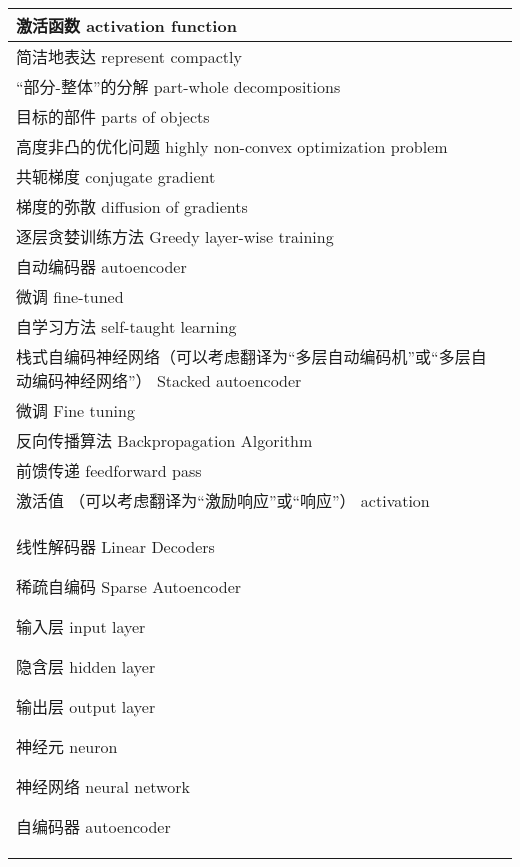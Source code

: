 \begin{longtable}[h]{m{}m{}}
激活函数 activation function \\
  \midrule

简洁地表达 represent compactly \\
  \midrule

“部分-整体”的分解 part-whole decompositions \\
  \midrule

目标的部件 parts of objects \\
  \midrule

高度非凸的优化问题 highly non-convex optimization problem \\
  \midrule

共轭梯度 conjugate gradient \\
  \midrule

梯度的弥散 diffusion of gradients \\
  \midrule

逐层贪婪训练方法 Greedy layer-wise training \\
  \midrule

自动编码器 autoencoder \\
  \midrule

微调 fine-tuned \\
  \midrule

自学习方法 self-taught learning \\
  \midrule

栈式自编码神经网络（可以考虑翻译为“多层自动编码机”或“多层自动编码神经网络”） Stacked autoencoder \\
  \midrule

微调 Fine tuning \\
  \midrule

反向传播算法 Backpropagation Algorithm \\
  \midrule

前馈传递 feedforward pass \\
  \midrule

激活值 （可以考虑翻译为“激励响应”或“响应”） activation \\
  \midrule

线性解码器 Linear Decoders 

稀疏自编码 Sparse Autoencoder 

输入层 input layer 

隐含层 hidden layer 

输出层 output layer 

神经元 neuron 

神经网络 neural network 

自编码器 autoencoder 


\end{longtable}
